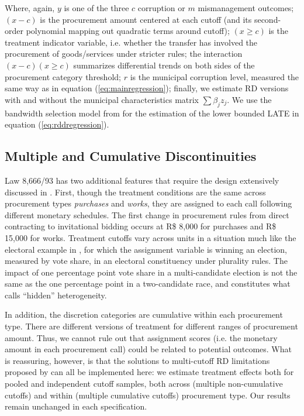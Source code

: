 \documentclass[11pt]{article}
\begin{document}
Where, again, $y$ is one of the three $c$ corruption or $m$ mismanagement outcomes; $(x - c)$ is the procurement amount centered at each cutoff (and its second-order polynomial mapping out quadratic terms around cutoff); $(x \geq c)$ is the treatment indicator variable, i.e. whether the transfer has involved the procurement of goods/services under stricter rules; the interaction $(x - c)(x \geq c)$ summarizes differential trends on both sides of the procurement category threshold; $r$ is the municipal corruption level, measured the same way as in equation (\ref{eq:mainregression}); finally, we estimate RD versions with and without the municipal characteristics matrix $\sum \beta_{j} z_{j}$. We use the bandwidth selection model from \citet{CalonicoRobustNonparametricConfidence2014} for the estimation of the lower bounded LATE in equation (\ref{eq:rddregression}).

\subsection{Multiple and Cumulative Discontinuities} \label{subsec:multiplecutoff}

Law 8,666/93 has two additional features that require the design extensively discussed in \citet{CattaneoInterpretingRegressionDiscontinuity2016}. First, though the treatment conditions are the same across procurement types \emph{purchases} and \emph{works}, they are assigned to each call following different monetary schedules. The first change in procurement rules from direct contracting to invitational bidding occurs at R\$ 8,000 for purchases and R\$ 15,000 for works. Treatment cutoffs vary across units in a situation much like the electoral example in \citet{CattaneoInterpretingRegressionDiscontinuity2016}, for which the assignment variable is winning an election, measured by vote share, in an electoral constituency under plurality rules. The impact of one percentage point vote share in a multi-candidate election is not the same as the one percentage point in a two-candidate race, and constitutes what \citet{CattaneoInterpretingRegressionDiscontinuity2016} calls ``hidden'' heterogeneity.

In addition, the discretion categories are cumulative within each procurement type. There are different versions of treatment for different ranges of procurement amount. Thus, we cannot rule out that assignment scores (i.e. the monetary amount in each procurement call) could be related to potential outcomes. What is reassuring, however, is that the solutions to multi-cutoff RD limitations proposed by \citet{CattaneoInterpretingRegressionDiscontinuity2016} can all be implemented here: we estimate treatment effects both for pooled and independent cutoff samples, both across (multiple non-cumulative cutoffs) and within (multiple cumulative cutoffs) procurement type. Our results remain unchanged in each specification.
\end{document}
